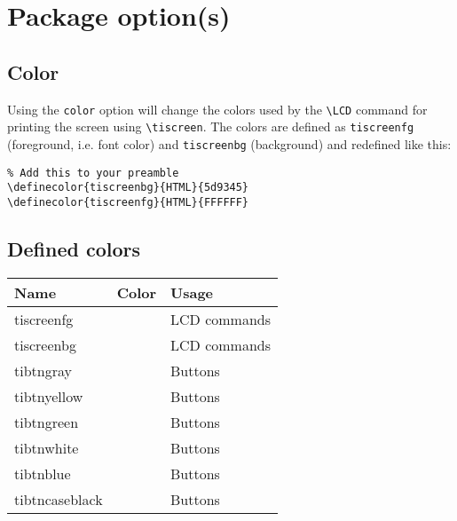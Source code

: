 \documentclass[a4paper,12pt]{article}
\begin{document}
\section{Package option(s)}

\subsection{Color} \label{sec:color}

Using the \texttt{color} option will change the colors used by the \verb|\LCD|
command for printing the screen using \verb|\tiscreen|. The colors are defined
as \texttt{tiscreenfg} (foreground, i.e. font color) and \texttt{tiscreenbg}
(background) and redefined like this:

\begin{Verbatim}
% Add this to your preamble
\definecolor{tiscreenbg}{HTML}{5d9345}
\definecolor{tiscreenfg}{HTML}{FFFFFF}
\end{Verbatim}

\subsection{Defined colors} \label{sec:colordef}

\begin{tabular}{lcl}
	Name            & Color                                                              & Usage        \\
	\hline
	tiscreenfg      & {\ttfamily \color{tiscreenfg}{000000}}                             & LCD commands \\
	tiscreenbg      & {\ttfamily \color{tiscreenbg}{5d9345}}                             & LCD commands \\
	tibtngray       & {\ttfamily \color{tibtngray}{494F54}}                              & Buttons      \\
	tibtnyellow     & {\ttfamily \colorbox{tibtncaseblack}{\color{tibtnyellow}{F1E78B}}} & Buttons      \\
	tibtngreen      & {\ttfamily \colorbox{tibtncaseblack}{\color{tibtngreen}{D5DE93}}}  & Buttons      \\
	tibtnwhite      & {\ttfamily \colorbox{tibtncaseblack}{\color{tibtnwhite}{E2E2E2}}}  & Buttons      \\
	tibtnblue       & {\ttfamily \colorbox{tibtncaseblack}{\color{tibtnblue}{CDE2E9}}}   & Buttons      \\
	tibtncaseblack  & {\ttfamily \color{tibtncaseblack}{232A32}}                         & Buttons      \\
\end{tabular}
\end{document}
